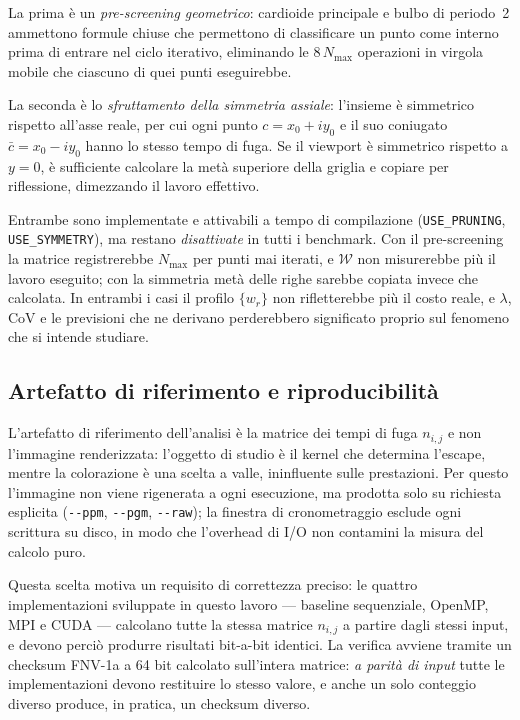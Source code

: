 La prima è un \emph{pre-screening geometrico}: cardioide principale e bulbo di
periodo~2 ammettono formule chiuse che permettono di classificare un punto come
interno prima di entrare nel ciclo iterativo, eliminando le $8\,N_{\max}$
operazioni in virgola mobile che ciascuno di quei punti eseguirebbe.

La seconda è lo \emph{sfruttamento della simmetria assiale}: l'insieme è
simmetrico rispetto all'asse reale, per cui ogni punto $c = x_0 + iy_0$
e il suo coniugato $\bar{c} = x_0 - iy_0$ hanno lo stesso tempo di
fuga. Se il viewport è simmetrico rispetto a $y = 0$, è sufficiente
calcolare la metà superiore della griglia e copiare per riflessione,
dimezzando il lavoro effettivo.

Entrambe sono implementate e attivabili a tempo di compilazione
(\texttt{USE\_PRUNING}, \texttt{USE\_SYMMETRY}), ma restano \emph{disattivate}
in tutti i benchmark. Con il pre-screening la matrice registrerebbe $N_{\max}$
per punti mai iterati, e $\mathcal{W}$ non misurerebbe più il lavoro eseguito;
con la simmetria metà delle righe sarebbe copiata invece che calcolata. In
entrambi i casi il profilo $\{w_r\}$ non rifletterebbe più il costo reale, e
$\lambda$, $\mathrm{CoV}$ e le previsioni che ne derivano perderebbero
significato proprio sul fenomeno che si intende studiare.

\subsection{Artefatto di riferimento e riproducibilità}
\label{sec:artefatto}
L'artefatto di riferimento dell'analisi è la matrice dei tempi di fuga
$n_{i,j}$ e non l'immagine renderizzata: l'oggetto di studio è il
kernel che determina l'escape, mentre la colorazione è una scelta a
valle, ininfluente sulle prestazioni. Per questo l'immagine non viene
rigenerata a ogni esecuzione, ma prodotta solo su richiesta esplicita
(\texttt{-{}-ppm}, \texttt{-{}-pgm}, \texttt{-{}-raw}); la finestra di
cronometraggio esclude ogni scrittura su disco, in modo che l'overhead
di I/O non contamini la misura del calcolo puro.

Questa scelta motiva un requisito di correttezza preciso: le quattro
implementazioni sviluppate in questo lavoro --- baseline sequenziale,
OpenMP, MPI e CUDA --- calcolano tutte la stessa matrice $n_{i,j}$ a
partire dagli stessi input, e devono perciò produrre risultati
bit-a-bit identici. La verifica avviene tramite un checksum FNV-1a a 64 bit
calcolato sull'intera matrice: \textit{a parità di input} tutte le
implementazioni devono restituire lo stesso valore, e anche un solo conteggio
diverso produce, in pratica, un checksum diverso.

